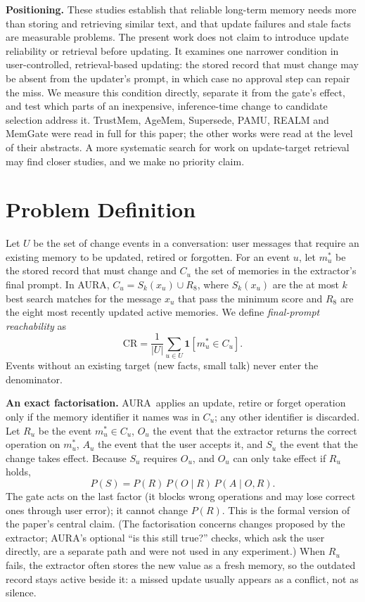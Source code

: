 \IfFileExists{IEEEtran.cls}{\documentclass[journal]{IEEEtran}\def\HAVEIEEE{1}}{\documentclass[10pt,twocolumn]{article}\usepackage[margin=0.7in,columnsep=0.25in]{geometry}}
\newcommand{\aura}{AURA}
\begin{document}
\textbf{Positioning.} These studies establish that reliable long-term memory needs more than storing and retrieving similar text, and that update failures and stale facts are measurable problems. The present work does not claim to introduce update reliability or retrieval before updating. It examines one narrower condition in user-controlled, retrieval-based updating: the stored record that must change may be absent from the updater's prompt, in which case no approval step can repair the miss. We measure this condition directly, separate it from the gate's effect, and test which parts of an inexpensive, inference-time change to candidate selection address it. TrustMem, AgeMem, Supersede, PAMU, REALM and MemGate were read in full for this paper; the other works were read at the level of their abstracts. A more systematic search for work on update-target retrieval may find closer studies, and we make no priority claim.

\section{Problem Definition}
\label{sec:problem}
Let $U$ be the set of change events in a conversation: user messages that require an existing memory to be updated, retired or forgotten. For an event $u$, let $m^*_u$ be the stored record that must change and $C_u$ the set of memories in the extractor's final prompt. In \aura, $C_u = S_k(x_u) \cup R_8$, where $S_k(x_u)$ are the at most $k$ best search matches for the message $x_u$ that pass the minimum score and $R_8$ are the eight most recently updated active memories. We define \emph{final-prompt reachability} as
\begin{equation}
\mathrm{CR} = \frac{1}{|U|}\sum_{u\in U} \mathbf{1}\left[m^*_u \in C_u\right].
\end{equation}
Events without an existing target (new facts, small talk) never enter the denominator.

\textbf{An exact factorisation.} \aura\ applies an update, retire or forget operation only if the memory identifier it names was in $C_u$; any other identifier is discarded. Let $R_u$ be the event $m^*_u\in C_u$, $O_u$ the event that the extractor returns the correct operation on $m^*_u$, $A_u$ the event that the user accepts it, and $S_u$ the event that the change takes effect. Because $S_u$ requires $O_u$, and $O_u$ can only take effect if $R_u$ holds,
\begin{equation}
P(S) = P(R)\,P(O \mid R)\,P(A \mid O, R).
\end{equation}
The gate acts on the last factor (it blocks wrong operations and may lose correct ones through user error); it cannot change $P(R)$. This is the formal version of the paper's central claim. (The factorisation concerns changes proposed by the extractor; \aura's optional ``is this still true?'' checks, which ask the user directly, are a separate path and were not used in any experiment.) When $R_u$ fails, the extractor often stores the new value as a fresh memory, so the outdated record stays active beside it: a missed update usually appears as a conflict, not as silence.
\end{document}
